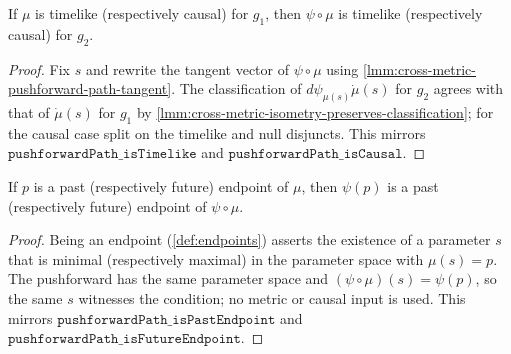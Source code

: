 \begin{lemma}
    \label{lmm:cross-metric-pushforward-path-causal}
    If $\mu$ is timelike (respectively causal) for $g_1$, then $\psi \circ \mu$ is timelike (respectively causal) for $g_2$.
\end{lemma}
\begin{proof}
    Fix $s$ and rewrite the tangent vector of $\psi \circ \mu$ using \ref{lmm:cross-metric-pushforward-path-tangent}. The classification of $d\psi_{\mu(s)}\dot\mu(s)$ for $g_2$ agrees with that of $\dot\mu(s)$ for $g_1$ by \ref{lmm:cross-metric-isometry-preserves-classification}; for the causal case split on the timelike and null disjuncts. This mirrors $\mathtt{pushforwardPath\_isTimelike}$ and $\mathtt{pushforwardPath\_isCausal}$.
\end{proof}

\begin{lemma}
    \label{lmm:cross-metric-pushforward-path-endpoints}
    If $p$ is a past (respectively future) endpoint of $\mu$, then $\psi(p)$ is a past (respectively future) endpoint of $\psi \circ \mu$.
\end{lemma}
\begin{proof}
    Being an endpoint (\ref{def:endpoints}) asserts the existence of a parameter $s$ that is minimal (respectively maximal) in the parameter space with $\mu(s) = p$. The pushforward has the same parameter space and $(\psi \circ \mu)(s) = \psi(p)$, so the same $s$ witnesses the condition; no metric or causal input is used. This mirrors $\mathtt{pushforwardPath\_isPastEndpoint}$ and $\mathtt{pushforwardPath\_isFutureEndpoint}$.
\end{proof}

